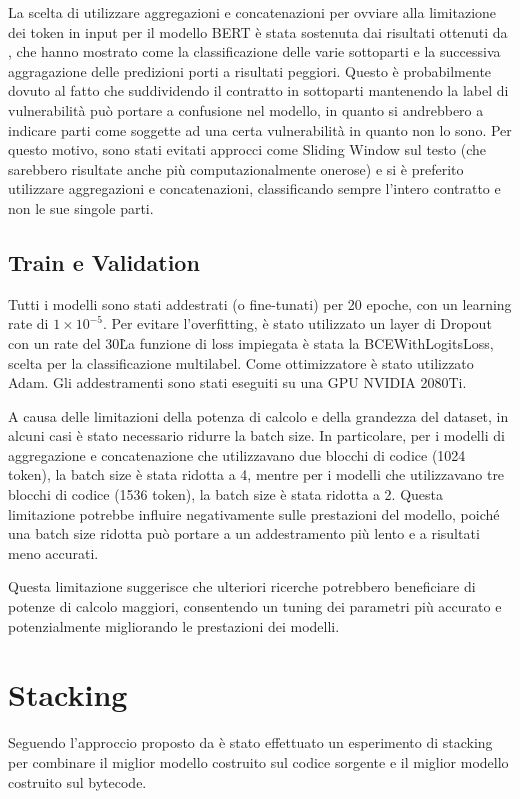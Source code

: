 \documentclass[../../Thesis.tex]{subfiles}
\begin{document}
La scelta di utilizzare aggregazioni e concatenazioni per ovviare alla limitazione dei token in input per il modello BERT è stata sostenuta dai risultati ottenuti da \cite{CodeBERTPaper}, che hanno mostrato come la classificazione delle varie sottoparti e la successiva aggragazione delle predizioni porti a risultati peggiori. Questo è probabilmente dovuto al fatto che suddividendo il contratto in sottoparti mantenendo la label di vulnerabilità può portare a confusione nel modello, in quanto si andrebbero a indicare parti come soggette ad una certa vulnerabilità in quanto non lo sono. Per questo motivo, sono stati evitati approcci come Sliding Window sul testo (che sarebbero risultate anche più computazionalmente onerose) e si è preferito utilizzare aggregazioni e concatenazioni, classificando sempre l'intero contratto e non le sue singole parti. 

\subsection{Train e Validation}
Tutti i modelli sono stati addestrati (o fine-tunati) per 20 epoche, con un learning rate di $1 \times 10^{-5}$. Per evitare l'overfitting, è stato utilizzato un layer di Dropout con un rate del 30\. La funzione di loss impiegata è stata la BCEWithLogitsLoss, scelta per la classificazione multilabel. Come ottimizzatore è stato utilizzato Adam. Gli addestramenti sono stati eseguiti su una GPU NVIDIA 2080Ti.

A causa delle limitazioni della potenza di calcolo e della grandezza del dataset, in alcuni casi è stato necessario ridurre la batch size. In particolare, per i modelli di aggregazione e concatenazione che utilizzavano due blocchi di codice (1024 token), la batch size è stata ridotta a 4, mentre per i modelli che utilizzavano tre blocchi di codice (1536 token), la batch size è stata ridotta a 2. Questa limitazione potrebbe influire negativamente sulle prestazioni del modello, poiché una batch size ridotta può portare a un addestramento più lento e a risultati meno accurati.

Questa limitazione suggerisce che ulteriori ricerche potrebbero beneficiare di potenze di calcolo maggiori, consentendo un tuning dei parametri più accurato e potenzialmente migliorando le prestazioni dei modelli.

\section{Stacking}
Seguendo l'approccio proposto da \cite{Deng} è stato effettuato un esperimento di stacking per combinare il miglior modello costruito sul codice sorgente e il miglior modello costruito sul bytecode.
\end{document}
